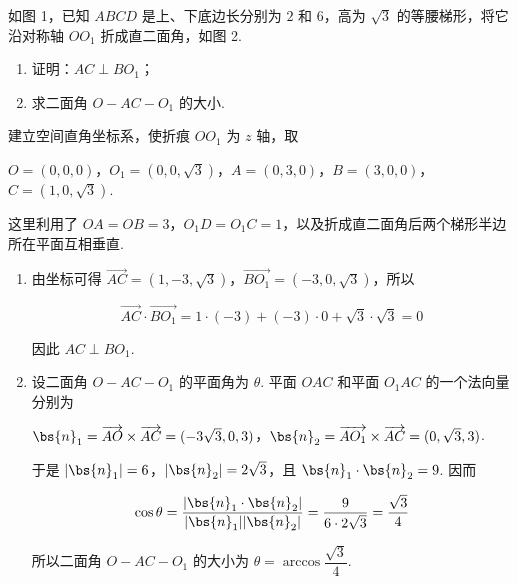 \begin{problem}
如图 1，已知 \(ABCD\) 是上、下底边长分别为 \(2\) 和 \(6\)，高为 \(\sqrt{3}\) 的等腰梯形，将它沿对称轴 \(OO_{1}\) 折成直二面角，如图 2.

\begin{enumerate}
\item 证明：\(AC \perp BO_{1}\)；
\item 求二面角 \(O - AC - O_{1}\) 的大小.
\end{enumerate}


\begin{solution}
建立空间直角坐标系，使折痕 \(OO_{1}\) 为 \(z\) 轴，取

\(O=(0,0,0)\)，\(O_{1}=(0,0,\sqrt{3})\)，\(A=(0,3,0)\)，\(B=(3,0,0)\)，\(C=(1,0,\sqrt{3})\).

这里利用了 \(OA=OB=3\)，\(O_{1}D=O_{1}C=1\)，以及折成直二面角后两个梯形半边所在平面互相垂直.

\begin{enumerate}
\item 由坐标可得 \(\overrightarrow{AC}=(1,-3,\sqrt{3})\)，\(\overrightarrow{BO_{1}}=(-3,0,\sqrt{3})\)，所以

\[
\overrightarrow{AC}\cdot\overrightarrow{BO_{1}}=1\cdot(-3)+(-3)\cdot0+\sqrt{3}\cdot\sqrt{3}=0
\]

因此 \(AC\perp BO_{1}\).

\item 设二面角 \(O-AC-O_{1}\) 的平面角为 \(\theta\). 平面 \(OAC\) 和平面 \(O_{1}AC\) 的一个法向量分别为

\(\bs{n}_1=\overrightarrow{AO}\times\overrightarrow{AC}=(-3\sqrt{3},0,3)\)，\(\bs{n}_2=\overrightarrow{AO_{1}}\times\overrightarrow{AC}=(0,\sqrt{3},3)\).

于是 \(\lvert\bs{n}_1\rvert=6\)，\(\lvert\bs{n}_2\rvert=2\sqrt{3}\)，且 \(\bs{n}_1\cdot\bs{n}_2=9\). 因而

\[
\cos\theta=\frac{\lvert\bs{n}_1\cdot\bs{n}_2\rvert}{\lvert\bs{n}_1\rvert\lvert\bs{n}_2\rvert}=\frac{9}{6\cdot2\sqrt{3}}=\frac{\sqrt{3}}{4}
\]

所以二面角 \(O-AC-O_{1}\) 的大小为 \(\theta=\arccos\dfrac{\sqrt{3}}{4}\).
\end{enumerate}
\end{solution}
\end{problem}

